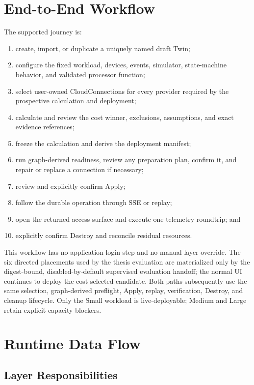 \section{End-to-End Workflow}
\label{sec:e2e-workflow}

The supported journey is:

\begin{enumerate}
    \item create, import, or duplicate a uniquely named draft Twin;
    \item configure the fixed workload, devices, events, simulator,
    state-machine behavior, and validated processor function;
    \item select user-owned CloudConnections for every provider required by
    the prospective calculation and deployment;
    \item calculate and review the cost winner, exclusions, assumptions, and
    exact evidence references;
    \item freeze the calculation and derive the deployment manifest;
    \item run graph-derived readiness, review any preparation plan, confirm it,
    and repair or replace a connection if necessary;
    \item review and explicitly confirm Apply;
    \item follow the durable operation through SSE or replay;
    \item open the returned access surface and execute one telemetry
    roundtrip; and
    \item explicitly confirm Destroy and reconcile residual resources.
\end{enumerate}

This workflow has no application login step and no manual layer override. The
six directed placements used by the thesis evaluation are materialized only by
the digest-bound, disabled-by-default supervised evaluation handoff; the normal
UI continues to deploy the cost-selected candidate. Both paths subsequently
use the same selection, graph-derived preflight, Apply, replay, verification,
Destroy, and cleanup lifecycle. Only the Small workload is live-deployable;
Medium and Large retain explicit capacity blockers.

\section{Runtime Data Flow}
\label{sec:layer-data-flow}

\subsection{Layer Responsibilities}
\label{sec:telemetry-flow}

